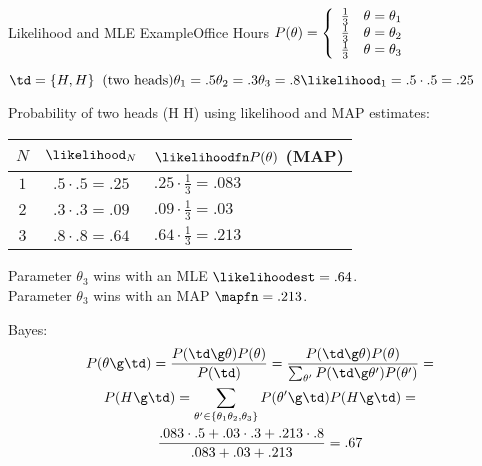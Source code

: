 \documentclass[12pt]{article}
\begin{document}
\begin{ddexample}{Likelihood and MLE Example}{Office Hours}
\noindent
\begin{math}
P(\theta) = \left\{
\begin{array}{l l}
\frac{1}{3} & \theta = \theta_1\\
\frac{1}{3} & \theta = \theta_2\\
\frac{1}{3} & \theta = \theta_3
\end{array} \right.\\
\end{math}

\noindent
\begin{math}
\td = \{ H, H \} \;\; \text{(two heads)}\\
\theta_1 = .5\\
\theta_2 = .3\\
\theta_3 = .8\\
\likelihood_1 =.5 \cdot .5 = .25
\end{math}

\vspace{.2cm}

\noindent
Probability of two heads (H H) using likelihood and MAP estimates:\\
\begin{tabular}{c|c|l}
$N$ & $\likelihood_N$ & $\likelihoodfn P(\theta)$ (MAP)\\
\hline
$1$ & $.5 \cdot .5 = .25$ & $.25 \cdot \frac{1}{3} = .083$\\
$2$ & $.3 \cdot .3 = .09$ & $.09 \cdot \frac{1}{3} = .03$\\
$3$ & $.8 \cdot .8 = .64$ & $.64 \cdot \frac{1}{3} = .213$\\
\end{tabular}

\vspace{.2cm}
\noindent
Parameter $\theta_3$ wins with an MLE $\likelihoodest = .64$.\\
Parameter $\theta_3$ wins with an MAP $\mapfn = .213$.

\vspace{.2cm}

\noindent
Bayes:\\
\begin{displaymath}
\begin{gathered}
P(\theta \g \td) = \frac{P(\td \g \theta)P(\theta)}{P(\td)}=
\frac{P(\td \g \theta)P(\theta)}{\sum_{\theta'}P(\td \g \theta')P(\theta')}=\\
P(H \g \td) = \sum_{\theta'\in \{\theta_1 \theta_2, \theta_3\}}P(\theta' \g \td)P(H \g \td)=\\
\frac
{.083 \cdot .5 + .03 \cdot .3 + .213 \cdot .8}
{.083 + .03 + .213}=.67
\end{gathered}
\end{displaymath}

\end{ddexample}
\end{document}
